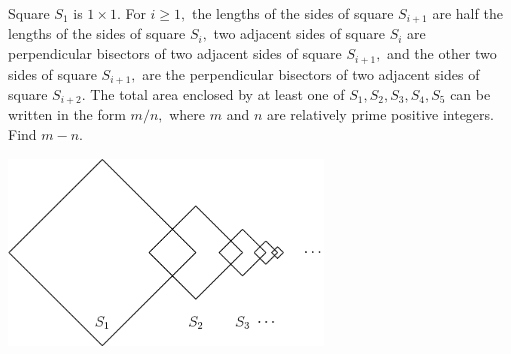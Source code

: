 Square $S_{1}$ is $1\times 1.$  For $i\ge 1,$ the lengths of the sides of square $S_{i+1}$ are half the lengths of the sides of square $S_{i},$ two adjacent sides of square $S_{i}$ are perpendicular bisectors of two adjacent sides of square $S_{i+1},$ and the other two sides of square $S_{i+1},$ are the perpendicular bisectors of two adjacent sides of square $S_{i+2}.$  The total area enclosed by at least one of $S_{1}, S_{2}, S_{3}, S_{4}, S_{5}$ can be written in the form $m/n,$ where $m$ and $n$ are relatively prime positive integers.  Find $m-n.$

\begin{center}
\includegraphics[width = 83.60000000000001mm]{img/fig0.png}
\end{center}